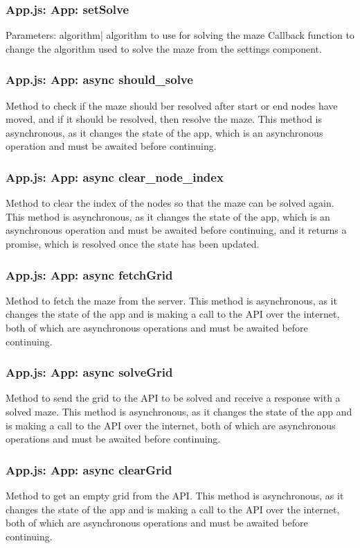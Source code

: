 \documentclass[titlepage]{article}
\begin{document}
\subsubsection{App.js: App: setSolve}
Parameters:\newline
\indent algorithm| algorithm to use for solving the maze\newline
Callback function to change the algorithm used to solve the maze from the settings component.

\subsubsection{App.js: App: async should\_solve}
Method to check if the maze should ber resolved after start or end nodes have moved, and if it should be resolved, then resolve the maze. This method is asynchronous, as it changes the state of the app, which is an asynchronous operation and must be awaited before continuing.

\subsubsection{App.js: App: async clear\_node\_index}
Method to clear the index of the nodes so that the maze can be solved again. This method is asynchronous, as it changes the state of the app, which is an asynchronous operation and must be awaited before continuing, and it returns a promise, which is resolved once the state has been updated.

\subsubsection{App.js: App: async fetchGrid}
Method to fetch the maze from the server. This method is asynchronous, as it changes the state of the app and is making a call to the API over the internet, both of which are asynchronous operations and must be awaited before continuing.

\subsubsection{App.js: App: async solveGrid}
Method to send the grid to the API to be solved and receive a response with a solved maze. This method is asynchronous, as it changes the state of the app and is making a call to the API over the internet, both of which are asynchronous operations and must be awaited before continuing.

\subsubsection{App.js: App: async clearGrid}
Method to get an empty grid from the API. This method is asynchronous, as it changes the state of the app and is making a call to the API over the internet, both of which are asynchronous operations and must be awaited before continuing.
\end{document}
